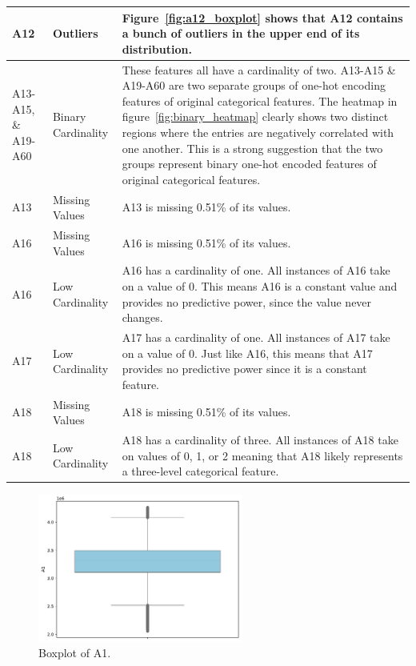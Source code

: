 \documentclass[11pt]{report}
\begin{document}
\begin{longtable}{lp{5cm}p{8cm}}
\midrule
A12 & Outliers & Figure~\ref{fig:a12_boxplot} shows that A12 contains a bunch of outliers in the upper end of its distribution. \\
\midrule
A13-A15, \& A19-A60 & Binary Cardinality & These features all have a cardinality of two. A13-A15 \& A19-A60 are two separate groups of one-hot encoding features of original categorical features. The heatmap in figure~\ref{fig:binary_heatmap} clearly shows two distinct regions where the entries are negatively correlated with one another. This is a strong suggestion that the two groups represent binary one-hot encoded features of original categorical features. \\
\midrule
A13 & Missing Values & A13 is missing 0.51\% of its values. \\
\midrule
A16 & Missing Values & A16 is missing 0.51\% of its values. \\
\midrule
A16 & Low Cardinality & A16 has a cardinality of one. All instances of A16 take on a value of 0. This means A16 is a constant value and provides no predictive power, since the value never changes. \\
\midrule
A17 & Low Cardinality & A17 has a cardinality of one. All instances of A17 take on a value of 0. Just like A16, this means that A17 provides no predictive power since it is a constant feature. \\ 
\midrule
A18 & Missing Values & A18 is missing 0.51\% of its values. \\
\midrule
A18 & Low Cardinality & A18 has a cardinality of three. All instances of A18 take on values of 0, 1, or 2 meaning that A18 likely represents a three-level categorical feature.
\end{longtable}



\begin{figure}[H]
    \centering
    \includegraphics[width=0.6\textwidth]{images/A1_boxplot.pdf}
    \caption{Boxplot of A1.}
    \label{fig:a1_boxplot}
\end{figure}
\end{document}
